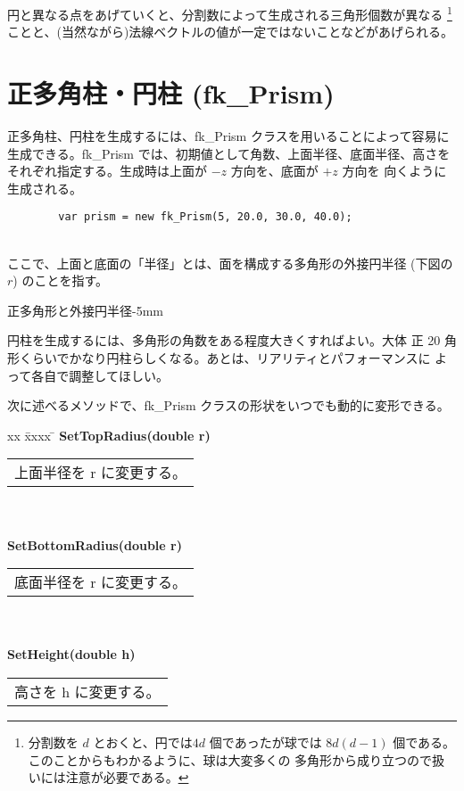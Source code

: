 円と異なる点をあげていくと、分割数によって生成される三角形個数が異なる
\footnote{分割数を \(d\) とおくと、円では\(4d\) 個であったが球では
\(8d(d-1)\) 個である。このことからもわかるように、球は大変多くの
多角形から成り立つので扱いには注意が必要である。}
ことと、(当然ながら)法線ベクトルの値が一定ではないことなどがあげられる。

\section{正多角柱・円柱 (fk\_Prism)}
正多角柱、円柱を生成するには、fk\_Prism クラスを用いることによって容易に
生成できる。fk\_Prism では、初期値として角数、上面半径、底面半径、高さを
それぞれ指定する。生成時は上面が \(-z\) 方向を、底面が \(+z\) 方向を
向くように生成される。
\\
\begin{screen}
\begin{verbatim}
        var prism = new fk_Prism(5, 20.0, 30.0, 40.0);
\end{verbatim}
\end{screen}
~ \\
ここで、上面と底面の「半径」とは、面を構成する多角形の外接円半径
(下図の \(r\)) のことを指す。

	{正多角形と外接円半径}{-5mm}

円柱を生成するには、多角形の角数をある程度大きくすればよい。大体
正 20 角形くらいでかなり円柱らしくなる。あとは、リアリティとパフォーマンスに
よって各自で調整してほしい。

次に述べるメソッドで、fk\_Prism クラスの形状をいつでも動的に変形できる。
\begin{tabbing}
xx \= xxxx \= \kill
\> \textbf{SetTopRadius(double r)} \\
	\> \> \begin{tabular}{p{15cm}}
		上面半径を r に変更する。
	\end{tabular} \\ \\

\> \textbf{SetBottomRadius(double r)} \\
	\> \> \begin{tabular}{p{15cm}}
		底面半径を r に変更する。
	\end{tabular} \\ \\

\> \textbf{SetHeight(double h)} \\
	\> \> \begin{tabular}{p{15cm}}
		高さを h に変更する。
	\end{tabular}
\end{tabbing}

